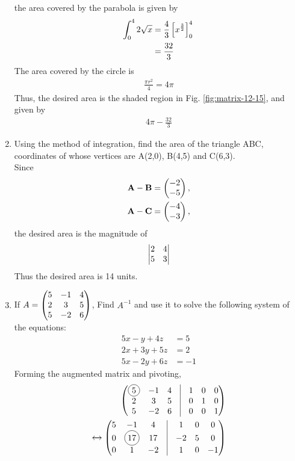 \documentclass[journal,12pt,twocolumn]{IEEEtran}
\renewcommand\thesection{\arabic{section}}
\begin{document}
\begin{enumerate}[label=\thesection.\arabic*.,ref=\thesection.\theenumi]
the area covered by the parabola is given by 
\begin{align}
	\int_{0}^{4}2\sqrt{x} &= \frac{4}{3}{}\left[x^{\frac{3}{2}}\right]_{0}^4{}	
	\\
	&= \frac{32}{3}
\end{align}
The area covered by the circle is
\begin{align}
	\frac{\pi r^2}{4} = 4\pi
\end{align}
Thus, the desired area is 
the shaded region in Fig. 
	\ref{fig:matrix-12-15},
	and given by 
\begin{align}
 4\pi - \frac{32}{3}
\end{align}





    
\item Using the method of integration, find the area of the triangle ABC, coordinates of whose vertices are A(2,0), B(4,5) and C(6,3).\\
    \solution Since 
\begin{align}
	\mathbf{A}-\mathbf{B} &= \begin{pmatrix}-2 \\-5\end{pmatrix},
	\\
	\mathbf{A}-\mathbf{C} &= \begin{pmatrix}-4 \\-3\end{pmatrix},
    \end{align}
    the desired area is  the magnitude of 
\begin{align}
 \begin{vmatrix}2 & 4\\5 & 3\end{vmatrix} 
    \end{align}
    Thus the desired area is 14 units.
\item If $A=\begin{pmatrix}5 & -1 & 4 \\ 2 & 3 & 5 \\ 5 & -2 & 6\end{pmatrix} $, Find $A^{-1}$ and use it to solve the following system of the equations: \\
\begin{align}
	5x-y+4z &= 5 \nonumber \\
	2x+3y+5z &= 2 \nonumber \\
	5x-2y+6z &= -1 
\nonumber
\end{align}
   \solution Forming the augmented matrix and pivoting,  
\begin{align}
	\myvec{\circled{5} & -1 & 4 & \vrule & 1 & 0 & 0\\ 2 & 3 & 5 & \vrule & 0 & 1 & 0\\ 5 & -2 & 6 & \vrule & 0 & 0 & 1}
	\\
	\xleftrightarrow []{}
	\myvec{5 & -1 & 4 & \vrule & 1 & 0 & 0\\ 0 & \circled{17} & 17 & \vrule & -2 & 5 & 0\\ 0 & 1 & -2 & \vrule & 1 & 0 & -1}

\end{align}
\end{enumerate}
\end{document}
